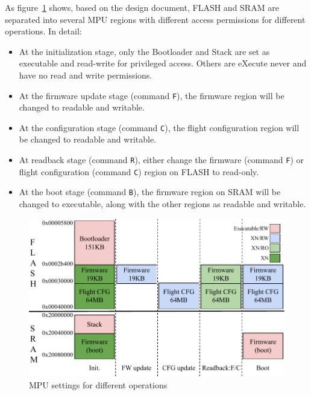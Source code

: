 \documentclass[11pt,oneside,onecolumn,letterpaper]{article}
\begin{document}
As figure~\ref{fig:mpu} shows, based on the design document, FLASH and SRAM are separated into several MPU regions with different access permissions for different operations.
In detail:
\begin{itemize}
	\item At the initialization stage, only the Bootloader and Stack are set as executable and read-write for privileged access.
	Others are eXecute never and have no read and write permissions.
	\item At the firmware update stage (command \verb|F|), the firmware region will be changed to readable and writable.
	\item At the configuration stage (command \verb|C|), the flight configuration region will be changed to readable and writable.
	\item At readback stage (command \verb|R|), either change the firmware (command \verb|F|) or flight configuration (command \verb|C|) region on FLASH to read-only.
	\item At the boot stage (command \verb|B|), the firmware region on SRAM will be changed to executable, along with the other regions as readable and writable.
\end{itemize}

\begin{figure}[!htbp]
	\begin{centering}
		\includegraphics[width = .8\textwidth]{pic/MPU_CFG.pdf}
		\caption{MPU settings for different operations}
		\label{fig:mpu}
	\end{centering}
\end{figure}


\end{document}
